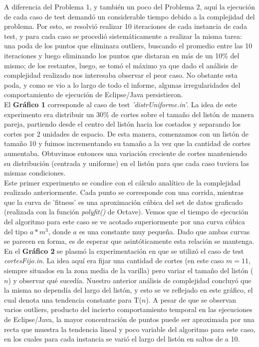 \indent A diferencia del Problema 1, y también un poco del Problema 2, aquí la ejecución de cada caso de test demandó un considerable tiempo debido a la complejidad del problema. Por esto, se resolvió realizar 10 iteraciones de cada instancia de cada test, y para cada caso se procedió sistemáticamente a realizar la misma tarea: una poda de los puntos que eliminara outliers, buscando el promedio entre las 10 iteraciones y luego eliminando los puntos que distaran en más de un 10\% del mismo; de los restantes, luego, se tomó el máximo ya que dado el análisis de complejidad realizado nos interesaba observar el peor caso. No obstante esta poda, y como se vio a lo largo de todo el informe, algunas irregularidades del comportamiento de ejecución de Eclipse/Java persistieron.\\
\indent El \textbf{Gráfico 1} corresponde al caso de test \textit{'distrUniforme.in'}. La idea de este experimento era distribuir un 30\% de cortes sobre el tamaño del listón de manera pareja, partiendo desde el centro del listón hacia los costados y separando los cortes por 2 unidades de espacio. De esta manera, comenzamos con un listón de tamaño 10 y fuimos incrementando su tamaño a la vez que la cantidad de cortes aumentaba. Obtuvimos entonces una variación creciente de cortes manteniendo su distribución (centrada y uniforme) en el listón para que cada caso tuviera las mismas condiciones.\\
\indent Este primer experimento se condice con el cálculo analítico de la complejidad realizado anteriormente. Cada punto se corresponde con una corrida, mientras que la curva de 'fitness' es una aproximación cúbica del set de datos graficado (realizada con la función \textit{polyfit()} de Octave). Vemos que el tiempo de ejecución del algoritmo para este caso se ve acotado superiormente por una curva cúbica del tipo $a*m^3$, donde $a$ es una constante muy pequeña. Dado que ambas curvas se parecen en forma, es de esperar que asintóticamente esta relación  se mantenga.\\
\indent En el \textbf{Gráfico 2} se plasmó la experimentación en que se utilizó el caso de test \textit{cortesFijo.in}. La idea aquí era fijar una cantidad de cortes (en este caso $m = 11$, siempre situados en la zona media de la varilla) pero variar el tamaño del listón ($n$) y observar qué sucedía. Nuestro anterior análisis de complejidad concluyó que la misma no dependía del largo del listón, y esto se ve reflejado en este gráfico, el cual denota una tendencia constante para T($n$). A pesar de que se observan varios outliers, producto del incierto comportamiento temporal en las ejecuciones de Eclipse/Java, la mayor concentración de puntos puede ser aproximada por una recta que muestra la tendencia lineal y poco variable del algoritmo para este caso, en los cuales para cada instancia se varió el largo del listón en saltos de a 10.\\
